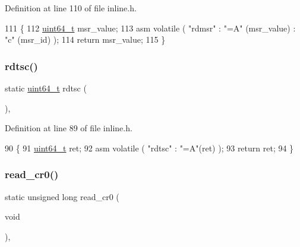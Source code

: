 Definition at line 110 of file inline.\+h.


\begin{DoxyCode}
111 \{
112     \hyperlink{a00092_aa232ecf786a74ce5363c36c10798d2b1_aa232ecf786a74ce5363c36c10798d2b1}{uint64\_t} msr\_value;
113     \textcolor{keyword}{asm} \textcolor{keyword}{volatile} ( \textcolor{stringliteral}{"rdmsr"} : \textcolor{stringliteral}{"=A"} (msr\_value) : \textcolor{stringliteral}{"c"} (msr\_id) );
114     \textcolor{keywordflow}{return} msr\_value;
115 \}
\end{DoxyCode}
\mbox{\label{a00104_a47b9d70be3022fd0b5687d9794ca47bc_a47b9d70be3022fd0b5687d9794ca47bc}} 
\subsubsection{\texorpdfstring{rdtsc()}{rdtsc()}}
{\footnotesize\ttfamily static \hyperlink{a00092_aa232ecf786a74ce5363c36c10798d2b1_aa232ecf786a74ce5363c36c10798d2b1}{uint64\+\_\+t} rdtsc (\begin{DoxyParamCaption}{ }\end{DoxyParamCaption})\hspace{0.3cm}{\ttfamily [inline]}, {\ttfamily [static]}}



Definition at line 89 of file inline.\+h.


\begin{DoxyCode}
90 \{
91     \hyperlink{a00092_aa232ecf786a74ce5363c36c10798d2b1_aa232ecf786a74ce5363c36c10798d2b1}{uint64\_t} ret;
92     \textcolor{keyword}{asm} \textcolor{keyword}{volatile} ( \textcolor{stringliteral}{"rdtsc"} : \textcolor{stringliteral}{"=A"}(ret) );
93     \textcolor{keywordflow}{return} ret;
94 \}
\end{DoxyCode}
\mbox{\label{a00104_ac85e095222f364961e091702bb6bc2ff_ac85e095222f364961e091702bb6bc2ff}} 
\subsubsection{\texorpdfstring{read\+\_\+cr0()}{read\_cr0()}}
{\footnotesize\ttfamily static unsigned long read\+\_\+cr0 (\begin{DoxyParamCaption}\item[{void}]{ }\end{DoxyParamCaption})\hspace{0.3cm}{\ttfamily [inline]}, {\ttfamily [static]}}



